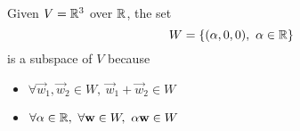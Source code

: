 \begin{example}
    Given $V = \mathbb{R}^3$ over $\mathbb{R}$, the set
    $$ W = \{(\alpha, 0, 0),\ \alpha \in \mathbb{R}\} $$
    is a subspace of $V$ because
    \begin{itemize}
        \item $\forall \vec{w}_1, \vec{w}_2 \in W,\ \vec{w}_1 + \vec{w}_2 \in W$
        \item $\forall \alpha \in \mathbb{R},\ \forall \mathbf{w} \in W,\ \alpha\mathbf{w} \in W$
    \end{itemize}
\end{example}
